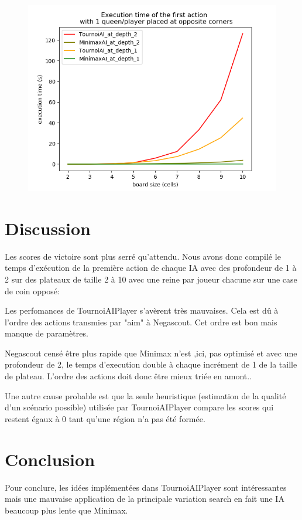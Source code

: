 \documentclass[utf8]{article}
\begin{document}
\begin{figure}[H]
  \centering
	\includegraphics[scale=0.8]{img/Figure_1.png}
  \label{fig:logo}
\end{figure}

\newpage

\section{Discussion}
    Les scores de victoire sont plus serré qu'attendu.
    Nous avons donc compilé le temps d'exécution de la première action de chaque IA avec des profondeur de 1 à 2 sur des plateaux de taille 2 à 10 avec une reine par joueur chacune sur une case de coin opposé:

    Les perfomances de TournoiAIPlayer s'avèrent très mauvaises.
    Cela est dû à l'ordre des actions transmies par "aim" à Negascout. Cet ordre est bon mais manque de paramètres.

    Negascout censé être plus rapide que Minimax n'est ,ici, pas optimisé et avec une profondeur de 2, le temps d'execution double à chaque incrément de 1 de la taille de plateau.
    L'ordre des actions doit donc être mieux triée en amont..

    Une autre cause probable est que la seule heuristique (estimation de la qualité d’un scénario possible) utilisée par TournoiAIPlayer compare les scores qui restent égaux à 0 tant qu'une région n'a pas été formée.


\section{Conclusion}
Pour conclure, les idées implémentées dans TournoiAIPlayer sont intéressantes mais une mauvaise application de la principale variation search en fait une IA beaucoup plus lente que Minimax.
\end{document}
